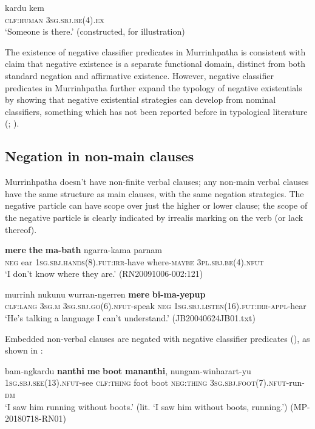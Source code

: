 \documentclass[output=paper,colorlinks,citecolor=brown]{langscibook}
\begin{document}
\ea\label{ex:mur:66} 
    \gll  kardu kem\\ 
          \textsc{clf:human} \textsc{3sg.sbj.be(4).ex}\\
    \glt ‘Someone is there.’ (constructed, for illustration)
\z 


The existence of negative classifier predicates in Murrinhpatha is consistent with  claim that negative existence is a separate functional domain, distinct from both standard negation and affirmative existence. However, negative classifier predicates in Murrinhpatha further expand the typology of negative existentials by showing that negative existential strategies can develop from nominal classifiers, something which has not been reported before in typological literature (\citealt{Eriksen2011}; \citealt{Veselinova2013neg.exist}). 

\subsection{Negation in non-main clauses} \label{sec:mur:2.4}

Murrinhpatha doesn’t have non-finite verbal clauses; any non-main verbal clauses have the same structure as main clauses, with the same negation strategies. The negative particle can have scope over just the higher  or lower  clause; the scope of the negative particle is clearly indicated by irrealis marking on the verb (or lack thereof).

\ea\label{ex:mur:67}
    \gll \textbf{mere} \textbf{the} \textbf{ma-bath} ngarra-kama parnam\\
        \textsc{neg} ear \textsc{1sg.sbj.hands(8).fut:irr}{}-have where-\textsc{maybe} \textsc{3pl.sbj.be(4).nfut} \\
    \glt ‘I don’t know where they are.’ (RN20091006-002:121)
\z 

\ea\label{ex:mur:68}
    \gll murrinh nukunu wurran-ngerren \textbf{mere} \textbf{bi-ma-yepup}\\
          \textsc{clf:lang} \textsc{3sg.m} \textsc{3sg.sbj.go(6).nfut}{}-speak \textsc{neg} \textsc{1sg.sbj.listen(16).fut:irr-appl}{}-hear\\
    \glt ‘He’s talking a language I can't understand.’ (JB20040624JB01.txt)
\z

Embedded non-verbal clauses are negated with negative classifier predicates (), as shown in :

\ea\label{ex:mur:69} 
    \gll bam-ngkardu \textbf{nanthi} \textbf{me} \textbf{boot} \textbf{mananthi}, nungam-winharart-yu\\
         \textsc{1sg.sbj.see(13).nfut}{}-see \textsc{clf:thing} foot boot \textsc{neg:thing} \textsc{3sg.sbj.foot(7).nfut}{}-run-\textsc{dm}\\
    \glt ‘I saw him running without boots.’ (lit. ‘I saw him without boots, running.’) (MP-20180718-RN01)
\z
\end{document}
